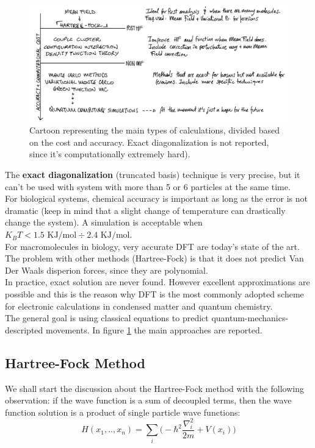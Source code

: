 \begin{figure}[htbp!]
	\centering
	\includegraphics[scale=0.30]{img_13}
	\caption{Cartoon representing the main types of calculations, divided based on the cost and accuracy. Exact diagonalization is not reported, since it's computationally extremely hard). }
\label{fig:calculations}
\end{figure}

The \textbf{exact diagonalization} (truncated basis) technique is very precise, but it can't be used with system with more than 5 or 6 particles at the same time.\\
For biological systems, chemical accuracy is important as long as the error is not dramatic (keep in mind that a slight change of temperature can drastically change the system). A simulation is acceptable when $K_BT < 1.5\text{ KJ/mol} \div 2.4 \text{ KJ/mol}$.\\
For macromolecules in biology, very accurate DFT are today's state of the art. The problem with other methods (Hartree-Fock) is that it does not predict Van Der Waals disperion forces, since they are polynomial. 
\\
In practice, exact solution are never found. However excellent approximations are possible and this is the reason why DFT is the most commonly adopted scheme for electronic calculations in condensed matter and quantum chemistry.\\

The general goal is using classical equations to predict quantum-mechanics-descripted movements. In figure \ref{fig:calculations} the main approaches are reported.\\

\subsection{Hartree-Fock Method}
We shall start the discussion about the Hartree-Fock method with the following observation: if the wave function is a sum of decoupled terms, then the wave function solution is a product of single particle wave functions:
 \[
 H(x_1,.., x_n) = \sum_i \bigg(-\hbar^2 \frac{\nabla_i^2}{2m} + V(x_i) \bigg)
 \]
 
